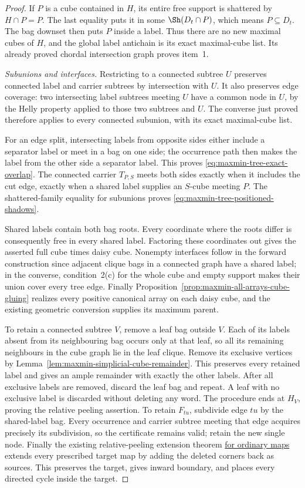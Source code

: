 \begin{proof}
If $P$ is a cube contained in $H$, its entire free support is shattered
by $H\cap P=P$. The last equality puts it in some $\Sh(D_t\cap P)$,
which means $P\subseteq D_t$. The bag downset then puts $P$ inside a
label. Thus there are no new maximal cubes of $H$, and the global label
antichain is its exact maximal-cube list. Its already proved chordal
intersection graph proves item~1.

\emph{Subunions and interfaces.} Restricting to a connected subtree $U$
preserves connected label and carrier subtrees by intersection with $U$.
It also preserves edge coverage: two intersecting label subtrees meeting
$U$ have a common node in $U$, by the Helly property applied to those
two subtrees and $U$. The converse just proved therefore applies to every
connected subunion, with its exact maximal-cube list.

For an edge split, intersecting labels from opposite sides either include
a separator label or meet in a bag on one side; the occurrence path then
makes the label from the other side a separator label. This proves
\eqref{eq:maxmin-tree-exact-overlap}. The connected carrier $T_{P,S}$
meets both sides exactly when it includes the cut edge, exactly when a
shared label supplies an $S$-cube meeting $P$.
The shattered-family equality for subunions proves
\eqref{eq:maxmin-tree-positioned-shadows}.

Shared labels contain both bag roots. Every coordinate where the roots
differ is consequently free in every shared label. Factoring these
coordinates out gives the asserted full cube times daisy cube.
Nonempty interfaces follow in the forward construction since adjacent
clique bags in a connected graph have a shared label; in the converse,
condition~2(c) for the whole cube and empty support makes their union
cover every tree edge. Finally Proposition~\ref{prop:maxmin-all-arrays-cube-gluing}
realizes every positive canonical array on each daisy cube, and
the existing geometric conversion supplies its maximum parent.

To retain a connected subtree $V$, remove a leaf bag outside $V$.
Each of its labels absent from its neighbouring bag occurs only at that
leaf, so all its remaining neighbours in the cube graph lie in the leaf
clique. Remove its exclusive vertices by
Lemma~\ref{lem:maxmin-simplicial-cube-remainder}. This preserves every
retained label and gives an ample remainder with exactly the other labels.
After all exclusive labels are removed, discard the leaf bag and repeat.
A leaf with no exclusive label is discarded without deleting any word.
The procedure ends at $H_V$, proving the relative peeling assertion.
To retain $F_{tu}$, subdivide edge $tu$ by the shared-label bag.
Every occurrence and carrier subtree meeting that edge acquires precisely
its subdivision, so the certificate remains valid; retain the new single
node. Finally the existing relative-peeling extension theorem
\href{../dismantlable-ample/sections/classification/uso_dictionary.tex}
{for ordinary maps} extends every prescribed target map by adding the
deleted corners back as sources. This preserves the target, gives inward
boundary, and places every directed cycle inside the target.
\end{proof}

